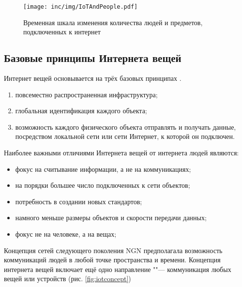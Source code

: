 \begin{figure}
  \centering
  \texttt{[image: inc/img/IoTAndPeople.pdf]}
	\caption{Временная шкала изменения количества людей и предметов, подключенных к интернет}
  \label{fig:iotandpeople}
\end{figure}


\subsection{Базовые принципы Интернета вещей}

Интернет вещей основывается на трёх базовых принципах \cite{roslyakov2014}.
\begin{enumerate}
	\item повсеместно распространенная инфраструктура;
	\item глобальная идентификация каждого объекта;
	\item возможность каждого физического объекта отправлять и получать данные, посредством локальной сети или сети Интернет, к которой он подключен.
\end{enumerate}

Наиболее важными отличиями Интернета вещей от интернета людей являются:
\begin{itemize}
	\item фокус на считывание информации, а не на коммуникациях;
	\item на порядки большее число подключенных к сети объектов;
	\item потребность в создании новых стандартов;
	\item намного меньше размеры объектов и скорости передачи данных;
	\item фокус не на человеке, а на вещах;
\end{itemize}

Концепция сетей следующего поколения NGN предполагала возможность коммуникаций людей в любой точке пространства и времени.
Концепция интернета вещей включает ещё одно направление ""--- коммуникация любых вещей или устройств (рис. \ref{fig:iotconcept})

